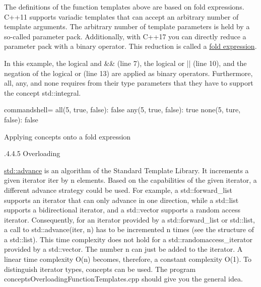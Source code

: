 The definitions of the function templates above are based on fold expressions. C++11 supports variadic templates that can accept an arbitrary number of template arguments. The arbitrary number of template parameters is held by a so-called parameter pack. Additionally, with C++17 you can directly reduce a parameter pack with a binary operator. This reduction is called a \href{https://www.modernescpp.com/index.php/fold-expressions}{fold expression}.

In this example, the logical and \&\& (line 7), the logical or || (line 10), and the negation of the logical or (line 13) are applied as binary operators. Furthermore, all, any, and none requires from their type parameters that they have to support the concept std::integral.

\begin{tcblisting}{commandshell={}}
all(5, true, false): false
any(5, true, false): true
none(5, ture, false): false
\end{tcblisting}

\begin{center}
Applying concepts onto a fold expression
\end{center}

.4.4.5\hspace{0.2cm} Overloading

\href{https://en.cppreference.com/w/cpp/iterator/advance}{std::advance} is an algorithm of the Standard Template Library. It increments a given iterator iter by n elements. Based on the capabilities of the given iterator, a different advance strategy could be used. For example, a std::forward\_list supports an iterator that can only advance in one direction, while a std::list supports a bidirectional iterator, and a std::vector supports a random access iterator. Consequently, for an iterator provided by a std::forward\_list or std::list, a call to std::advance(iter, n) has to be incremented n times (see the structure of a std::list). This time complexity does not hold for a std::randomaccess\_iterator provided by a std::vector. The number n can just be added to the iterator. A linear time complexity O(n) becomes, therefore, a constant complexity O(1). To distinguish iterator types, concepts can be used. The program conceptsOverloadingFunctionTemplates.cpp should give you the general idea.

